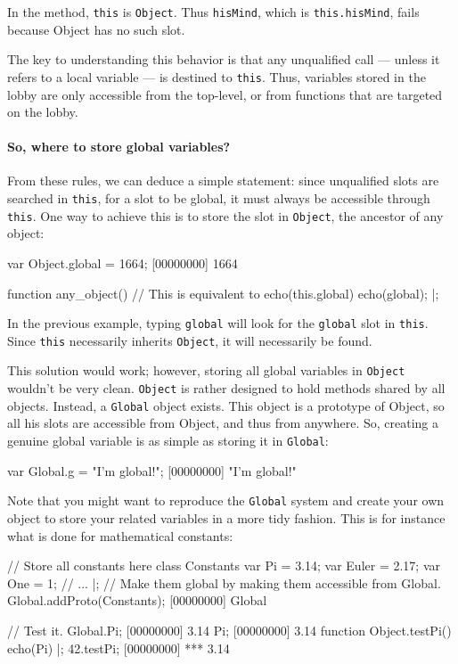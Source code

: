 In the method, \lstinline|this| is \lstinline|Object|. Thus
\lstinline|hisMind|, which is \lstinline|this.hisMind|, fails because
Object has no such slot.

The key to understanding this behavior is that any unqualified call
--- unless it refers to a local variable --- is destined to
\lstinline|this|. Thus, variables stored in the lobby are only
accessible from the top-level, or from functions that are targeted on
the lobby.

\paragraph{So, where to store global variables?}
From these rules, we can deduce a simple statement: since unqualified
slots are searched in \lstinline|this|, for a slot to be global, it
must always be accessible through \lstinline|this|. One way to achieve
this is to store the slot in \lstinline|Object|, the ancestor of any
object:

\begin{urbiscript}
var Object.global = 1664;
[00000000] 1664

function any_object()
{
  // This is equivalent to echo(this.global)
  echo(global);
}|;
\end{urbiscript}

In the previous example, typing \lstinline|global| will look for the
\lstinline|global| slot in \lstinline|this|. Since \lstinline|this|
necessarily inherits \lstinline|Object|, it will necessarily be found.

This solution would work; however, storing all global variables in
\lstinline|Object| wouldn't be very clean. \lstinline|Object| is
rather designed to hold methods shared by all objects. Instead, a
\lstinline|Global| object exists. This object is a prototype of
Object, so all his slots are accessible from Object, and thus from
anywhere. So, creating a genuine global variable is as simple as
storing it in \lstinline|Global|:

\begin{urbiscript}
var Global.g = "I'm global!";
[00000000] "I'm global!"
\end{urbiscript}

Note that you might want to reproduce the \lstinline|Global| system
and create your own object to store your related variables in a more
tidy fashion. This is for instance what is done for mathematical
constants:

\begin{urbiscript}
// Store all constants here
class Constants
{
  var Pi = 3.14;
  var Euler = 2.17;
  var One = 1;
  // ...
}|;
// Make them global by making them accessible from Global.
Global.addProto(Constants);
[00000000] Global

// Test it.
Global.Pi;
[00000000] 3.14
Pi;
[00000000] 3.14
function Object.testPi() { echo(Pi) }|;
42.testPi;
[00000000] *** 3.14
\end{urbiscript}


